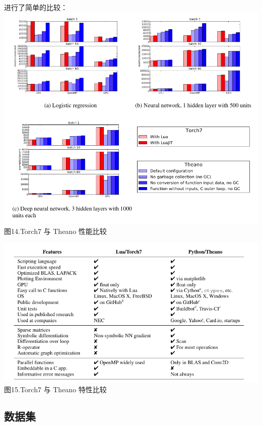 进行了简单的比较：\\\includegraphics{picture/torch-vs-theano-speed.png}\\图14.Torch7
与 Theano 性能比较

\includegraphics{picture/torch-vs-theano-feature.png}\\图15.Torch7 与
Theano 特性比较

\subsection{数据集}\label{ux6570ux636eux96c6}

